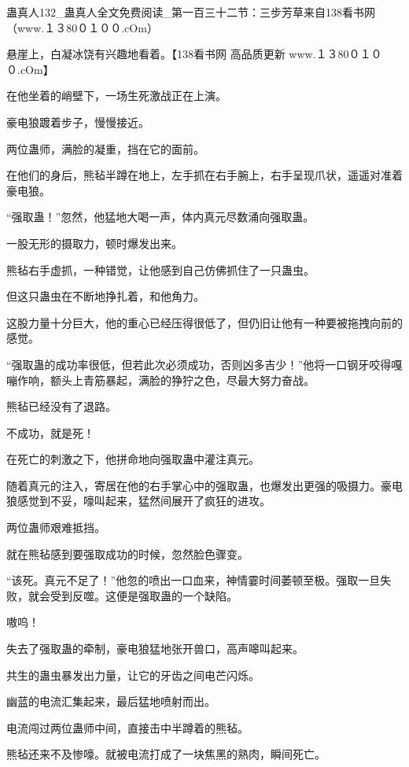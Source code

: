 
\begin{this_body}

蛊真人132\_蛊真人全文免费阅读\_第一百三十二节：三步芳草来自138看书网（www.１３80０１００.cOm）

悬崖上，白凝冰饶有兴趣地看着。【138看书网 高品质更新 www.１３80０１００.cOm】

在他坐着的峭壁下，一场生死激战正在上演。

豪电狼踱着步子，慢慢接近。

两位蛊师，满脸的凝重，挡在它的面前。

在他们的身后，熊毡半蹲在地上，左手抓在右手腕上，右手呈现爪状，遥遥对准着豪电狼。

“强取蛊！”忽然，他猛地大喝一声，体内真元尽数涌向强取蛊。

一股无形的摄取力，顿时爆发出来。

熊毡右手虚抓，一种错觉，让他感到自己仿佛抓住了一只蛊虫。

但这只蛊虫在不断地挣扎着，和他角力。

这股力量十分巨大，他的重心已经压得很低了，但仍旧让他有一种要被拖拽向前的感觉。

“强取蛊的成功率很低，但若此次必须成功，否则凶多吉少！”他将一口钢牙咬得嘎嘣作响，额头上青筋暴起，满脸的狰狞之色，尽最大努力奋战。

熊毡已经没有了退路。

不成功，就是死！

在死亡的刺激之下，他拼命地向强取蛊中灌注真元。

随着真元的注入，寄居在他的右手掌心中的强取蛊，也爆发出更强的吸摄力。豪电狼感觉到不妥，嚎叫起来，猛然间展开了疯狂的进攻。

两位蛊师艰难抵挡。

就在熊毡感到要强取成功的时候，忽然脸色骤变。

“该死。真元不足了！”他忽的喷出一口血来，神情霎时间萎顿至极。强取一旦失败，就会受到反噬。这便是强取蛊的一个缺陷。

嗷呜！

失去了强取蛊的牵制，豪电狼猛地张开兽口，高声嗥叫起来。

共生的蛊虫暴发出力量，让它的牙齿之间电芒闪烁。

幽蓝的电流汇集起来，最后猛地喷射而出。

电流闯过两位蛊师中间，直接击中半蹲着的熊毡。

熊毡还来不及惨嚎。就被电流打成了一块焦黑的熟肉，瞬间死亡。


\end{this_body}
